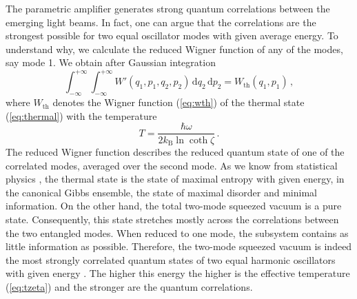 \documentclass[12pt,amsmath,amssymb]{article}
\numberwithin{equation}{section}
\begin{document}
The parametric amplifier generates strong quantum correlations
between the emerging light beams. In fact, one can argue
\cite{BP1,BP2} that the correlations are the strongest possible
for two equal oscillator modes with given average energy.
To understand why, we calculate the reduced Wigner function
of any of the modes, say mode 1.
We obtain after Gaussian integration
\begin{equation}
\int_{-\infty}^{+\infty}\int_{-\infty}^{+\infty}
W'(q_1,p_1,q_2,p_2) \,\mathrm{d}q_2\,\mathrm{d}p_2 =
W_\mathrm{th}(q_1,p_1) \,,
\end{equation}
where $W_\mathrm{th}$ denotes the Wigner function
(\ref{eq:wth}) of the thermal state (\ref{eq:thermal})
with the temperature
\begin{equation}
\label{eq:tzeta}
T = \frac{\hbar\omega}{2k_\mathrm{B}\ln\coth\zeta} \,.
\end{equation}
The reduced Wigner function describes the reduced quantum state
of one of the correlated modes, averaged over the second mode.
As we know from statistical physics \cite{LL5}, the thermal state
is the state of maximal entropy with given energy,
in the canonical Gibbs ensemble, the state of maximal disorder
and minimal information.
On the other hand, the total two-mode squeezed vacuum is a pure
state. Consequently, this state stretches mostly across
the correlations between the two entangled modes.
When reduced to one mode, the subsystem contains as little
information as possible. Therefore, the two-mode squeezed
vacuum is indeed the most strongly correlated quantum states
of two equal harmonic oscillators with given energy \cite{BP1,BP2}.
The higher this energy the higher is the effective temperature
(\ref{eq:tzeta}) and the stronger are the quantum correlations.
\end{document}
